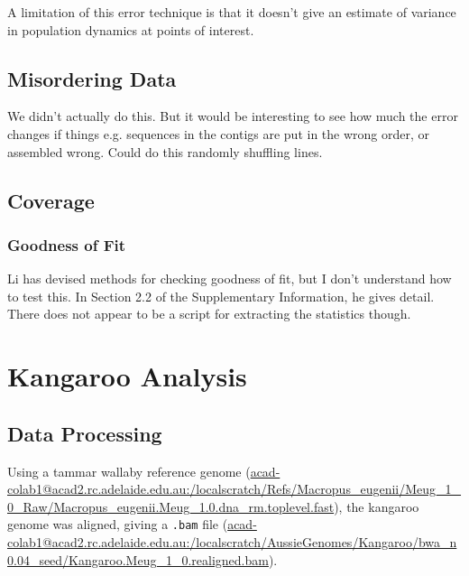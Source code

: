 \documentclass[11pt,a4paper]{article}
\begin{document}
A limitation of this error technique is that it doesn't give an estimate of variance in population dynamics at points of interest.

\subsection{Misordering Data}
We didn't actually do this. But it would be interesting to see how much the error changes if things e.g. sequences in the contigs are put in the wrong order, or assembled wrong. Could do this randomly shuffling lines.

\subsection{Coverage}

\subsubsection{Goodness of Fit}
Li \cite{li2011inference} has devised methods for checking goodness of fit, but I don't understand how to test this. In Section 2.2 of the Supplementary Information, he gives detail. There does not appear to be a script for extracting the statistics though.

\section{Kangaroo Analysis}
\subsection{Data Processing}
Using a tammar wallaby reference genome (\url{acad-colab1@acad2.rc.adelaide.edu.au:/localscratch/Refs/Macropus_eugenii/Meug_1_0_Raw/Macropus_eugenii.Meug_1.0.dna_rm.toplevel.fast}), the kangaroo genome was aligned, giving a \verb|.bam| file (\url{acad-colab1@acad2.rc.adelaide.edu.au:/localscratch/AussieGenomes/Kangaroo/bwa_n0.04_seed/Kangaroo.Meug_1_0.realigned.bam}).
\end{document}
